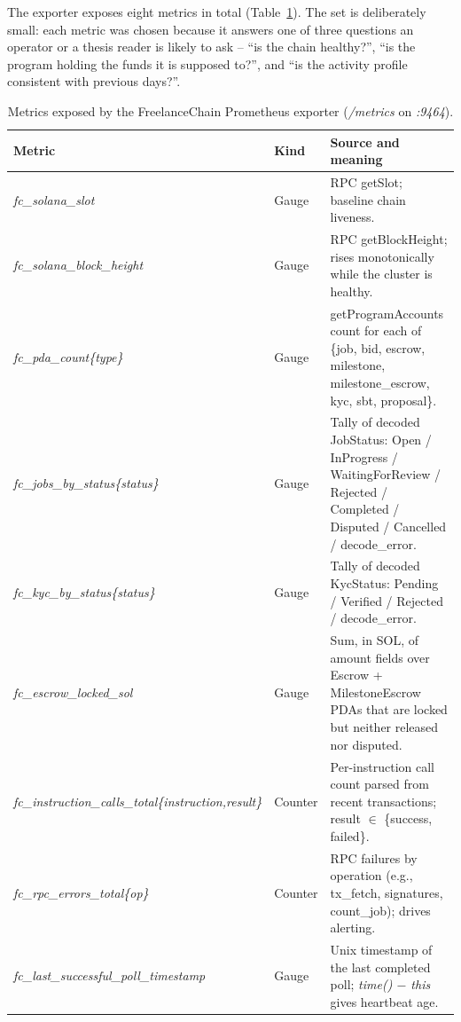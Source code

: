 The exporter exposes eight metrics in total (Table~\ref{table:obs_metrics}). The set is deliberately small: each metric was chosen because it answers one of three questions an operator or a thesis reader is likely to ask -- ``is the chain healthy?'', ``is the program holding the funds it is supposed to?'', and ``is the activity profile consistent with previous days?''.

\begin{table}[H]
\centering
\caption{Metrics exposed by the FreelanceChain Prometheus exporter (\emph{/metrics} on \emph{:9464}).}
\label{table:obs_metrics}
\small
\begin{tabular}{|l|l|p{6.5cm}|}
\hline
\textbf{Metric} & \textbf{Kind} & \textbf{Source and meaning} \\ \hline
\emph{fc\_solana\_slot} & Gauge & RPC getSlot; baseline chain liveness. \\ \hline
\emph{fc\_solana\_block\_height} & Gauge & RPC getBlockHeight; rises monotonically while the cluster is healthy. \\ \hline
\emph{fc\_pda\_count\{type\}} & Gauge & getProgramAccounts count for each of \{job, bid, escrow, milestone, milestone\_escrow, kyc, sbt, proposal\}. \\ \hline
\emph{fc\_jobs\_by\_status\{status\}} & Gauge & Tally of decoded JobStatus: Open / InProgress / WaitingForReview / Rejected / Completed / Disputed / Cancelled / decode\_error. \\ \hline
\emph{fc\_kyc\_by\_status\{status\}} & Gauge & Tally of decoded KycStatus: Pending / Verified / Rejected / decode\_error. \\ \hline
\emph{fc\_escrow\_locked\_sol} & Gauge & Sum, in SOL, of amount fields over Escrow + MilestoneEscrow PDAs that are locked but neither released nor disputed. \\ \hline
\emph{fc\_instruction\_calls\_total\{instruction,result\}} & Counter & Per-instruction call count parsed from recent transactions; result $\in$ \{success, failed\}. \\ \hline
\emph{fc\_rpc\_errors\_total\{op\}} & Counter & RPC failures by operation (e.g., tx\_fetch, signatures, count\_job); drives alerting. \\ \hline
\emph{fc\_last\_successful\_poll\_timestamp} & Gauge & Unix timestamp of the last completed poll; \emph{time() $-$ this} gives heartbeat age. \\ \hline
\end{tabular}
\end{table}

